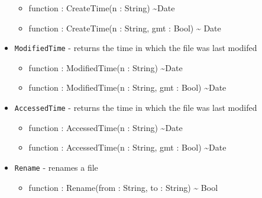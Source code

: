 \documentclass[11pt]{article}
\begin{document}
\begin{itemize}
\begin{itemize}
  \item function : CreateTime(n : String) \textasciitilde Date
  \item function : CreateTime(n : String, gmt : Bool) \textasciitilde
    Date
  \end{itemize}
\item \texttt{ModifiedTime} - returns the time in which the file was
  last modifed
  \begin{itemize}
  \item function : ModifiedTime(n : String) \textasciitilde Date
  \item function : ModifiedTime(n : String, gmt : Bool)
    \textasciitilde Date
  \end{itemize}
\item \texttt{AccessedTime} - returns the time in which the file was
  last modifed
  \begin{itemize}
  \item function : AccessedTime(n : String) \textasciitilde Date
  \item function : AccessedTime(n : String, gmt : Bool)
    \textasciitilde Date
  \end{itemize}
\item \texttt{Rename} - renames a file
  \begin{itemize}
  \item function : Rename(from : String, to : String) \textasciitilde
    Bool
  \end{itemize}
\end{itemize}
\end{document}
